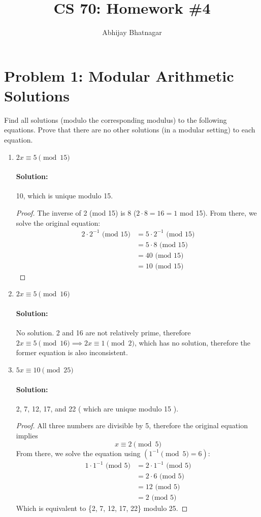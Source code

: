 \documentclass[11pt, notitlepage]{report}
\makeatletter
\newcommand{\Question}[1]{\newpage\section{#1}}
\newenvironment{solution}{\paragraph{Solution:}}{\hfill}
\newcommand*{\toccontents}{\@starttoc{toc}}
\makeatother
\begin{document}
   \title{CS 70: Homework \#4}
   \author{Abhijay Bhatnagar}
   \maketitle
   \toccontents



\setcounter{secnumdepth}{0} %
\Question {Problem 1: Modular Arithmetic Solutions}

Find all solutions (modulo the corresponding modulus) to the following equations.  Prove that there are no other solutions (in a modular setting) to each equation.

\begin{enumerate}[label=(\alph*)] 
\item $2x \equiv 5 \pmod{15}$
\begin{solution}
	10, which is unique modulo 15.
	\begin{proof}
		The inverse of 2 (mod 15) is 8 ($2\cdot 8=16=1$ mod 15). From there, we solve the original equation:
		\begin{align*}
			2\cdot 2^{-1} \text{ (mod 15)} &= 5\cdot 2^{-1} \text{ (mod 15)} \\
			&= 5 \cdot 8 \text{ (mod 15)} \\
			&= 40 \text{ (mod 15)} \\
			&= 10 \text{ (mod 15)}
		\end{align*}
	\end{proof}
\end{solution}
\item $2x \equiv 5 \pmod{16}$
\begin{solution}
	No solution. 2 and 16 are not relatively prime, therefore $2x \equiv 5 \pmod{16} \implies 2x \equiv 1 \pmod{2}$, which has no solution, therefore the former equation is also inconsistent.

	
\end{solution}
\item $5x \equiv 10 \pmod{25}$
\begin{solution}
	2, 7, 12, 17, and 22 ( which are unique modulo 15 ).
	\begin{proof}
		All three numbers are divisible by 5, therefore the original equation implies \[x \equiv 2 \pmod{5}\]
		From there, we solve the equation using $(1^{-1} \pmod{5}=6)$:
		\begin{align*}
			1\cdot 1^{-1} \text{ (mod 5)} &= 2\cdot 1^{-1} \text{ (mod 5)} \\
			&= 2 \cdot 6 \text{ (mod 5)} \\
			&= 12 \text{ (mod 5)} \\
			&= 2 \text{ (mod 5)}
		\end{align*}
		Which is equivalent to \{2, 7, 12, 17, 22\} modulo 25.
	\end{proof}
\end{solution}
\end{enumerate}
\end{document}
